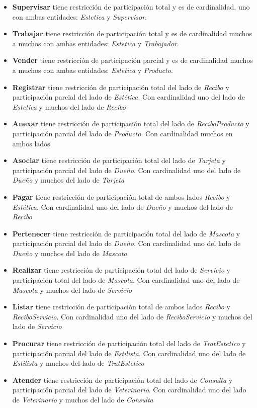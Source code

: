 \documentclass{exam}
\begin{document}
\begin{itemize}
	\item \textbf{Supervisar} tiene restricción de participación total y es de cardinalidad, uno con ambas entidades: \textit{Estetica} y \textit{Supervisor}.
	\item \textbf{Trabajar} tiene restricción de participación total y es de cardinalidad muchos a muchos con ambas entidades: \textit{Estetica} y \textit{Trabajador}.
	\item \textbf{Vender} tiene restricción de participación parcial y es de cardinalidad muchos a muchos con ambas entidades: \textit{Estetica} y \textit{Producto}.
	\item \textbf{Registrar} tiene restricción de participación total del lado de \textit{Recibo} y participación parcial del lado de \textit{Estética}. Con cardinalidad uno del lado de \textit{Estetica} y muchos del lado de \textit{Recibo}
	\item \textbf{Anexar} tiene restricción de participación total del lado de \textit{ReciboProducto} y participación parcial del lado de \textit{Producto}. Con cardinalidad muchos en ambos lados
	\item \textbf{Asociar} tiene restricción de participación total del lado de \textit{Tarjeta} y participación parcial del lado de \textit{Dueño}. Con cardinalidad uno del lado de \textit{Dueño} y muchos del lado de \textit{Tarjeta}
	\item \textbf{Pagar} tiene restricción de participación total de ambos lados \textit{Recibo} y \textit{Estética}. Con cardinalidad uno del lado de \textit{Dueño} y muchos del lado de \textit{Recibo}
	\item \textbf{Pertenecer} tiene restricción de participación total del lado de \textit{Mascota} y participación parcial del lado de \textit{Dueño}. Con cardinalidad uno del lado de \textit{Dueño} y muchos del lado de \textit{Mascota}
	\item \textbf{Realizar} tiene restricción de participación total del lado de \textit{Servicio} y participación total del lado de \textit{Mascota}. Con cardinalidad uno del lado de \textit{Mascota} y muchos del lado de \textit{Servicio}
	\item \textbf{Listar} tiene restricción de participación total de ambos lados \textit{Recibo} y \textit{ReciboServicio}. Con cardinalidad uno del lado de \textit{ReciboServicio} y muchos del lado de \textit{Servicio}
	\item \textbf{Procurar} tiene restricción de participación total del lado de \textit{TratEstetico} y participación parcial del lado de \textit{Estilista}. Con cardinalidad uno del lado de \textit{Estilista} y muchos del lado de \textit{TratEstetico}
	\item \textbf{Atender} tiene restricción de participación total del lado de \textit{Consulta} y participación parcial del lado de \textit{Veterinario}. Con cardinalidad uno del lado de \textit{Veterinario} y muchos del lado de \textit{Consulta}
\end{itemize}
\end{document}
